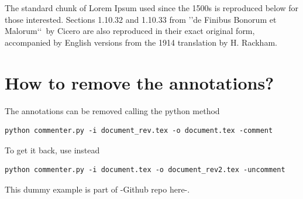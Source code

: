 \documentclass[]{article}
\begin{document}
The standard chunk of Lorem Ipsum used since the 1500s is reproduced below for those interested. Sections 1.10.32 and 1.10.33 from \rq\rq de Finibus Bonorum et Malorum\lq\lq~by Cicero are also reproduced in their exact original form, accompanied by English versions from the 1914 translation by H. Rackham.


\section{How to remove the annotations?}
The annotations can be removed  calling the python method 
\begin{verbatim}
python commenter.py -i document_rev.tex -o document.tex -comment
\end{verbatim}
To get it back, use instead
\begin{verbatim}
python commenter.py -i document.tex -o document_rev2.tex -uncomment
\end{verbatim}

\noindent
This dummy example is part of -Github repo here-.
\end{document}
